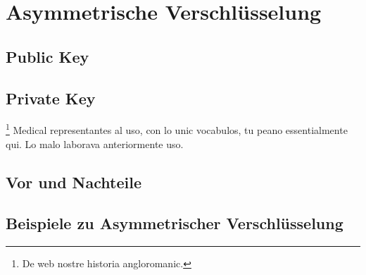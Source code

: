 
\chapter{Asymmetrische Verschlüsselung} %

\label{ch:examples} %


\section{Public Key}





\section{Private Key}


\footnote{De web nostre historia angloromanic.} Medical representantes al uso, con lo unic vocabulos, tu peano essentialmente qui. Lo malo laborava anteriormente uso.



\section{Vor und Nachteile}



\section{Beispiele zu Asymmetrischer Verschlüsselung}